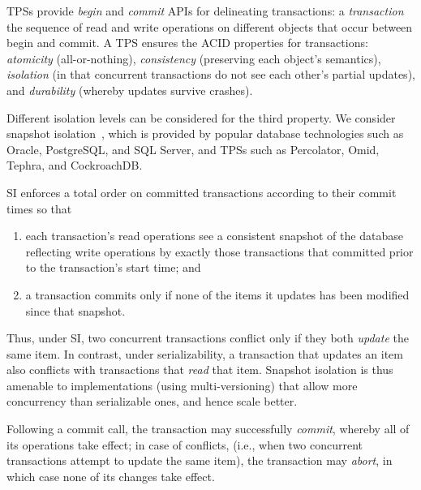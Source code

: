 TPSs provide \emph{begin} and \emph{commit} APIs for delineating transactions: 
a \emph{transaction} the sequence of read and write operations on different objects 
that occur between begin and commit. A TPS  ensures the ACID properties for transactions:
\emph{atomicity} (all-or-nothing), \emph{consistency} (preserving each object's semantics), 
\emph{isolation} (in that concurrent transactions do not see each other's partial updates), and 
\emph{durability} (whereby updates survive crashes).

Different isolation levels can be considered for the third property. We consider 
snapshot isolation~\cite{DBLP:conf/sigmod/BerensonBGMOO95}, 
which is provided by popular database technologies such as Oracle, PostgreSQL, and SQL Server,
and TPSs such as Percolator, Omid, Tephra, and  CockroachDB.

SI enforces a total order on committed transactions according to their commit times so that 
\begin{enumerate}
    \setlength{\itemsep}{0pt}
    \setlength{\parskip}{0pt}
    \setlength{\parsep}{2pt}  
\item
each transaction's read operations see a consistent snapshot of the database reflecting write operations by
 exactly those transactions that committed prior to the transaction's start time; and 
\item
 a transaction commits only if none of the items it updates has been modified since that snapshot.
 \end{enumerate}
Thus, under SI, two concurrent transactions conflict only if they both \emph{update} the same item.  
In contrast, under serializability, a transaction that updates an item also conflicts with transactions that \emph{read} that item. Snapshot isolation is thus amenable to implementations (using multi-versioning) that 
allow more concurrency than serializable ones, and hence scale better.

Following a commit call, the transaction may successfully \emph{commit}, whereby all of its operations take effect;
in case of conflicts, (i.e., when two concurrent transactions attempt to update the same item), the transaction may
\emph{abort}, in which case none of its changes take effect. 


